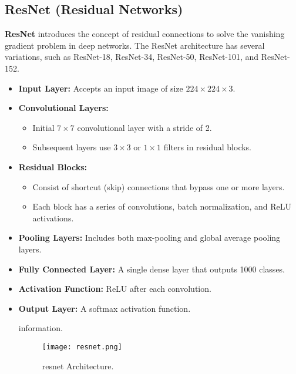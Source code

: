 \documentclass{article}
\begin{document}
\subsection{ResNet (Residual Networks)}
\textbf{ResNet} introduces the concept of residual connections to solve the vanishing gradient problem in deep networks. The ResNet architecture has several variations, such as ResNet-18, ResNet-34, ResNet-50, ResNet-101, and ResNet-152.
\begin{itemize}
    \item \textbf{Input Layer:} Accepts an input image of size $224\times224\times3$.
    \item \textbf{Convolutional Layers:} 
    \begin{itemize}
        \item Initial $7\times7$ convolutional layer with a stride of 2.
        \item Subsequent layers use $3\times3$ or $1\times1$ filters in residual blocks.
    \end{itemize}
    \item \textbf{Residual Blocks:} 
    \begin{itemize}
        \item Consist of shortcut (skip) connections that bypass one or more layers.
        \item Each block has a series of convolutions, batch normalization, and ReLU activations.
    \end{itemize}
    \item \textbf{Pooling Layers:} Includes both max-pooling and global average pooling layers.
    \item \textbf{Fully Connected Layer:} A single dense layer that outputs 1000 classes.
    \item \textbf{Activation Function:} ReLU after each convolution.
    \item \textbf{Output Layer:} A softmax activation function.

    information.  \begin{figure}[H]
    \centering
    \texttt{[image: resnet.png]}
    \caption{resnet Architecture.}
    \label{fig:conv_layer}
\end{figure}

\end{itemize}
\end{document}
